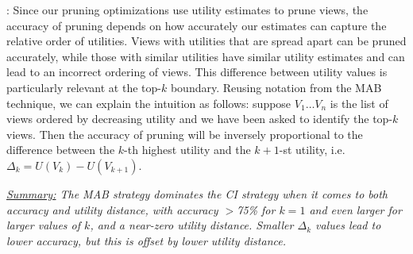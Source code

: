  :
 Since our pruning optimizations use utility estimates to prune views, 
 the accuracy of pruning depends on how accurately
 our estimates can capture the relative order of utilities.
 Views with utilities that are spread apart can be pruned accurately, while
 those with similar utilities have similar utility estimates and can 
 lead to an incorrect ordering of views.
 This difference between utility values is particularly relevant at the top-$k$
 boundary.
 Reusing notation from the MAB technique, we can explain the intuition as follows: 
 suppose $V_1 \ldots V_n$ is the list of views ordered by decreasing 
 utility and we have been asked to identify the top-$k$ views.
 Then the accuracy of pruning will be inversely proportional to the difference between
 the $k$-th highest utility and the $k+1$-st utility, 
 i.e. $\Delta_k = U(V_k) - U(V_{k+1})$.
 

{\em \underline{Summary:} The MAB strategy dominates the CI
strategy when it comes to both accuracy and utility distance,
with accuracy $>$75\%  for $k = 1$ and even larger for larger
values of $k$, and a near-zero utility distance. 
Smaller $\Delta_k$ values lead to lower accuracy, but this is offset by
lower utility distance.
 }

